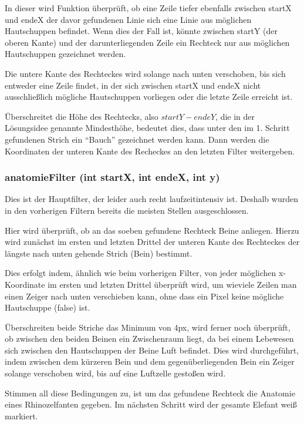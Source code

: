		In dieser wird Funktion überprüft, ob eine Zeile tiefer ebenfalls zwischen startX und endeX der davor gefundenen Linie sich eine Linie aus möglichen Hautschuppen befindet. Wenn dies der Fall ist, könnte zwischen startY (der oberen Kante) und der darunterliegenden Zeile ein Rechteck nur aus möglichen Hautschuppen gezeichnet werden. 

		Die untere Kante des Rechteckes wird solange nach unten verschoben, bis sich entweder eine Zeile findet, in der sich zwischen startX und endeX nicht ausschließlich mögliche Hautschuppen vorliegen oder die letzte Zeile erreicht ist.
		
		Überschreitet die Höhe des Rechtecks, also \(startY - endeY\), die in der Lösungsidee genannte Mindesthöhe, bedeutet dies, dass unter den im 1. Schritt gefundenen Strich ein "`Bauch"' gezeichnet werden kann. Dann werden die Koordinaten der unteren Kante des Recheckes an den letzten Filter weitergeben.

		\subsubsection{anatomieFilter (int startX, int endeX, int y)}
		Dies ist der Hauptfilter, der leider auch recht laufzeitintensiv ist. Deshalb wurden in den vorherigen Filtern bereits die meisten Stellen ausgeschlossen. 

		Hier wird überprüft, ob an das soeben gefundene Rechteck Beine anliegen. Hierzu wird zunächst im ersten und letzten Drittel der unteren Kante des Rechteckes der längste nach unten gehende Strich (Bein) bestimmt.

		Dies erfolgt indem, ähnlich wie beim vorherigen Filter, von jeder möglichen x-Koordinate im ersten und letzten Drittel überprüft wird, um wieviele Zeilen man einen Zeiger nach unten verschieben kann, ohne dass ein Pixel keine mögliche Hautschuppe (false) ist.
		
		Überschreiten beide Striche das Minimum von 4px, wird ferner noch überprüft, ob zwischen den beiden Beinen ein Zwischenraum liegt, da bei einem Lebewesen sich zwischen den Hautschuppen der Beine Luft befindet. Dies wird durchgeführt, indem zwischen dem kürzeren Bein und dem gegenüberliegenden Bein ein Zeiger solange verschoben wird, bis auf eine Luftzelle gestoßen wird.

		Stimmen all diese Bedingungen zu, ist um das gefundene Rechteck die Anatomie eines Rhinozelfanten gegeben. Im nächsten Schritt wird der gesamte Elefant weiß markiert.

